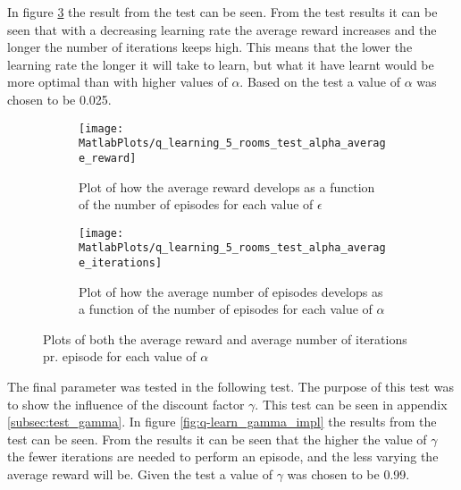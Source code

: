 \documentclass[../Head/Main.tex]{subfiles}
\begin{document}
In figure \ref{fig:q-learn_alpha_impl} the result from the test can be seen. From the test results it can be seen that with a decreasing learning rate the average reward increases and the longer the number of iterations keeps high. This means that the lower the learning rate the longer it will take to learn, but what it have learnt would be more optimal than with higher values of $\alpha$. Based on the test  a value of $\alpha$ was chosen to be 0.025.
\begin{figure}[H]
	\centering
	\begin{subfigure}[b]{0.49\textwidth}
		\centering
		\texttt{[image: MatlabPlots/q\_learning\_5\_rooms\_test\_alpha\_average\_reward]}
		\caption{Plot of how the average reward develops as a function of the number of episodes for each value of $\epsilon$}
		\label{fig:q-learn_alpha_reward_impl}
	\end{subfigure}
	\hfill
	\begin{subfigure}[b]{0.49\textwidth}
		\centering
		\texttt{[image: MatlabPlots/q\_learning\_5\_rooms\_test\_alpha\_average\_iterations]}
		\caption{Plot of how the average number of episodes develops as a function of the number of episodes for each value of $\alpha$}
		\label{fig:q-learn_alpha_iterations_impl}
	\end{subfigure}
	\caption{Plots of both the average reward and average number of iterations pr. episode for each value of $\alpha$}
	\label{fig:q-learn_alpha_impl}
\end{figure}
The final parameter was tested in the following test. The purpose of this test was to show the influence of the discount factor $\gamma$. This test can be seen in appendix \ref{subsec:test_gamma}. In figure \ref{fig:q-learn_gamma_impl} the results from the test can be seen. From the results it can be seen that the higher the value of $\gamma$ the fewer iterations are needed to perform an episode, and the less varying the average reward will be. Given the test a value of $\gamma$ was chosen to be 0.99.
\end{document}
